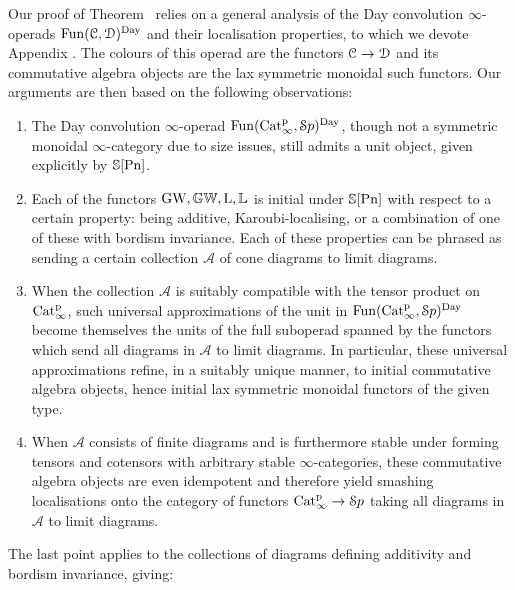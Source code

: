 Our proof of Theorem~ relies on a general analysis of the Day convolution $\infty$-operads $\operatorname{Fun}(\mathcal C,\mathcal{D})^{\mathrm{Day}}$ and their localisation properties, to which we devote Appendix . The colours of this operad are the functors $\mathcal C \to \mathcal{D}$ and its commutative algebra objects are the lax symmetric monoidal such functors. Our arguments are then based on the following observations:
\begin{enumerate}
\item
The Day convolution $\infty$-operad $\operatorname{Fun}(\mathrm{Cat}^{\mathrm p}_\infty,{\mathcal Sp})^{\mathrm{Day}}$, though not a symmetric monoidal $\infty$-category due to size issues, still admits a unit object, given explicitly by $\mathbb{S}[\mathrm{Pn}]$.
\item
Each of the functors $\operatorname{GW},\mathbb{GW},\operatorname L,\mathbb{L}$ is initial under $\mathbb{S}[\mathrm{Pn}]$ with respect to a certain property: being additive, Karoubi-localising, or a combination of one of these with bordism invariance. Each of these properties can be phrased as sending a certain collection $\mathcal A$ of cone diagrams to limit diagrams.
\item
When the collection $\mathcal A$ is suitably compatible with the tensor product on $\mathrm{Cat}^{\mathrm p}_\infty$, such universal approximations of the unit in $\operatorname{Fun}(\mathrm{Cat}^{\mathrm p}_\infty,{\mathcal Sp})^{\mathrm{Day}}$ become themselves the units of the full suboperad spanned by the functors which send all diagrams in $\mathcal{A}$ to limit diagrams. In particular, these universal approximations refine, in a suitably unique manner, to initial commutative algebra objects, hence initial lax symmetric monoidal functors of the given type. %
\item When $\mathcal A$ consists of finite diagrams and is furthermore stable under forming tensors and cotensors with arbitrary stable $\infty$-categories, these commutative algebra objects are even idempotent and therefore yield smashing localisations onto the category of functors $\mathrm{Cat}^{\mathrm p}_\infty \to {\mathcal Sp}$ taking all diagrams in $\mathcal A$ to limit diagrams. 
\end{enumerate}

The last point applies to the collections of diagrams defining additivity and bordism invariance, giving:

